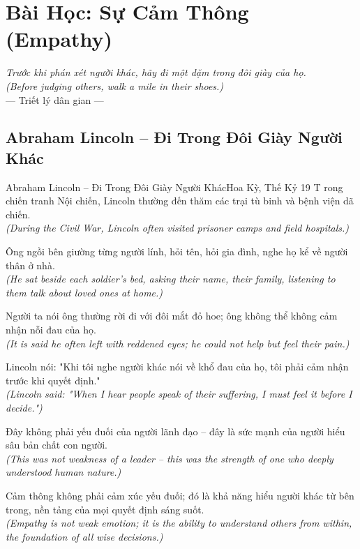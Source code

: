 \chapter{Bài Học: Sự Cảm Thông (Empathy)}
\begin{center}
  \textit{\color{truyenblue}Trước khi phán xét người khác, hãy đi một dặm trong đôi giày của họ.}\\
  \textit{(Before judging others, walk a mile in their shoes.)}\\[4pt]
  \small\color{truyengold}--- Triết lý dân gian ---
\end{center}
\ngancach

\section{Abraham Lincoln -- Đi Trong Đôi Giày Người Khác}
\begin{truyen}{Abraham Lincoln -- Đi Trong Đôi Giày Người Khác}{Hoa Kỳ, Thế Kỷ 19}
T rong chiến tranh Nội chiến, Lincoln thường đến thăm các trại tù binh và bệnh viện dã chiến.\\
\textit{(During the Civil War, Lincoln often visited prisoner camps and field hospitals.)}

Ông ngồi bên giường từng người lính, hỏi tên, hỏi gia đình, nghe họ kể về người thân ở nhà.\\
\textit{(He sat beside each soldier's bed, asking their name, their family, listening to them talk about loved ones at home.)}

Người ta nói ông thường rời đi với đôi mắt đỏ hoe; ông không thể không cảm nhận nỗi đau của họ.\\
\textit{(It is said he often left with reddened eyes; he could not help but feel their pain.)}

Lincoln nói: "Khi tôi nghe người khác nói về khổ đau của họ, tôi phải cảm nhận trước khi quyết định."\\
\textit{(Lincoln said: "When I hear people speak of their suffering, I must feel it before I decide.")}

Đây không phải yếu đuối của người lãnh đạo -- đây là sức mạnh của người hiểu sâu bản chất con người.\\
\textit{(This was not weakness of a leader -- this was the strength of one who deeply understood human nature.)}

\end{truyen}
\begin{baihoc}
  Cảm thông không phải cảm xúc yếu đuối; đó là khả năng hiểu người khác từ bên trong, nền tảng của mọi quyết định sáng suốt.\\
  \textit{(Empathy is not weak emotion; it is the ability to understand others from within, the foundation of all wise decisions.)}
\end{baihoc}

